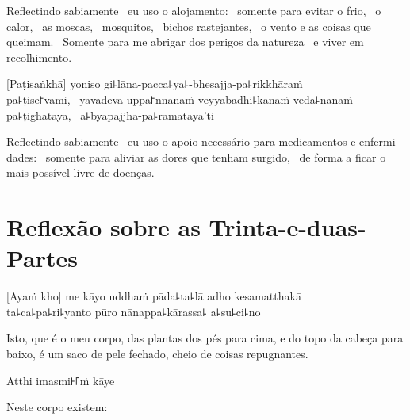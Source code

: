 \begin{english}
  Reflectindo sabiamente \pause\ eu uso o alojamento: \pause\ somente para evitar o
  frio, \pause\ o calor, \pause\ as moscas, \pause\ mosquitos, \pause\ bichos
  rastejantes, \pause\ o vento e as coisas que queimam. \pause\ Somente para me
  abrigar dos perigos da natureza \pause\ e viver em recolhimento.
\end{english}

[Paṭisaṅkhā] yoniso gi꜕lāna-pacca꜕ya꜕-bhesajja-pa꜕rikkhāraṁ\\
pa꜕ṭise꜓vāmi, \pause\ yāvadeva uppa꜓nnānaṁ veyyābādhi꜕kānaṁ veda꜕nānaṁ
pa꜕ṭighātāya, \pause\ a꜕byāpajjha-pa꜕ramatāyā'ti

\begin{english}
  Reflectindo sabiamente \pause\ eu uso o apoio necessário para medicamentos e
  enfermidades: \pause\ somente para aliviar as dores que tenham surgido,
  \pause\ de forma a ficar o mais possível livre de doenças.
\end{english}

\chapter[Trinta-e-duas-Partes]{Reflexão sobre as Trinta-e-duas-Partes}


\begin{leader}
\end{leader}

[Ayaṁ kho] me kāyo uddhaṁ pāda꜕ta꜕lā adho kesamatthakā\\
ta꜕ca꜕pa꜕ri꜕yanto pūro nānappa꜕kārassa꜕ a꜕su꜕ci꜕no

\begin{english}
  Isto, que é o meu corpo, das plantas dos pés para cima, e do topo da cabeça para baixo, é um saco de pele fechado, cheio de coisas repugnantes.
\end{english}

Atthi imasmi꜔꜒ṁ kāye

\begin{english}
  Neste corpo existem:
\end{english}

